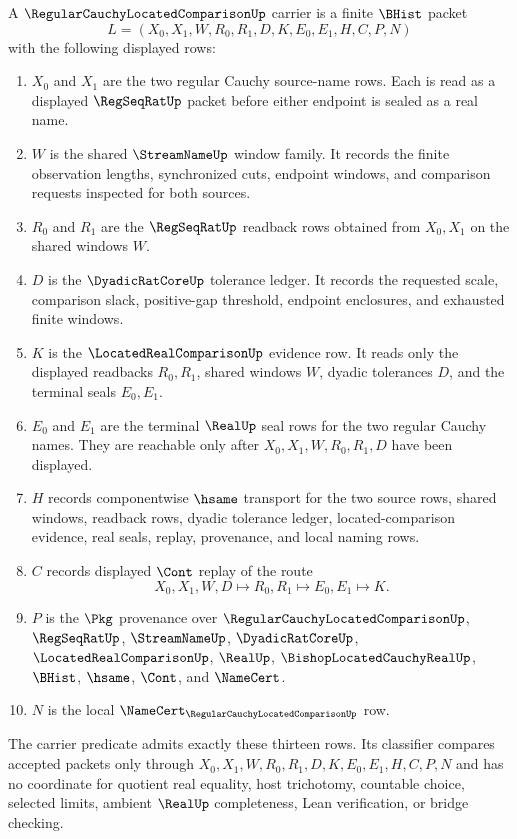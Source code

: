 \begin{definition}
\label{def:regular-cauchy-located-comparison-carrier}
A $\RegularCauchyLocatedComparisonUp$ carrier is a finite $\BHist$ packet
$$
L=(X_0,X_1,W,R_0,R_1,D,K,E_0,E_1,H,C,P,N)
$$
with the following displayed rows:
\begin{enumerate}
\item $X_0$ and $X_1$ are the two regular Cauchy source-name rows. Each is read as a displayed $\RegSeqRatUp$ packet before either endpoint is sealed as a real name.
\item $W$ is the shared $\StreamNameUp$ window family. It records the finite observation lengths, synchronized cuts, endpoint windows, and comparison requests inspected for both sources.
\item $R_0$ and $R_1$ are the $\RegSeqRatUp$ readback rows obtained from $X_0,X_1$ on the shared windows $W$.
\item $D$ is the $\DyadicRatCoreUp$ tolerance ledger. It records the requested scale, comparison slack, positive-gap threshold, endpoint enclosures, and exhausted finite windows.
\item $K$ is the $\LocatedRealComparisonUp$ evidence row. It reads only the displayed readbacks $R_0,R_1$, shared windows $W$, dyadic tolerances $D$, and the terminal seals $E_0,E_1$.
\item $E_0$ and $E_1$ are the terminal $\RealUp$ seal rows for the two regular Cauchy names. They are reachable only after $X_0,X_1,W,R_0,R_1,D$ have been displayed.
\item $H$ records componentwise $\hsame$ transport for the two source rows, shared windows, readback rows, dyadic tolerance ledger, located-comparison evidence, real seals, replay, provenance, and local naming rows.
\item $C$ records displayed $\Cont$ replay of the route
$$
X_0,X_1,W,D \longmapsto R_0,R_1 \longmapsto E_0,E_1 \longmapsto K .
$$
\item $P$ is the $\Pkg$ provenance over $\RegularCauchyLocatedComparisonUp$, $\RegSeqRatUp$, $\StreamNameUp$, $\DyadicRatCoreUp$, $\LocatedRealComparisonUp$, $\RealUp$, $\BishopLocatedCauchyRealUp$, $\BHist$, $\hsame$, $\Cont$, and $\NameCert$.
\item $N$ is the local $\NameCert_{\RegularCauchyLocatedComparisonUp}$ row.
\end{enumerate}
The carrier predicate admits exactly these thirteen rows. Its classifier compares accepted packets only through $X_0,X_1,W,R_0,R_1,D,K,E_0,E_1,H,C,P,N$ and has no coordinate for quotient real equality, host trichotomy, countable choice, selected limits, ambient $\RealUp$ completeness, Lean verification, or bridge checking.
\end{definition}

